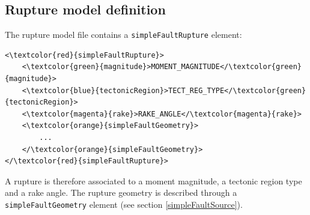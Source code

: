 \subsection{Rupture model definition}
The rupture model file contains a \Verb+simpleFaultRupture+ element:
\begin{Verbatim}[frame=single, commandchars=\\\{\},fontsize=\normalsize, samepage=true]
<\textcolor{red}{simpleFaultRupture}>
	<\textcolor{green}{magnitude}>MOMENT_MAGNITUDE</\textcolor{green}{magnitude}>
	<\textcolor{blue}{tectonicRegion}>TECT_REG_TYPE</\textcolor{green}{tectonicRegion}>
	<\textcolor{magenta}{rake}>RAKE_ANGLE</\textcolor{magenta}{rake}>
	<\textcolor{orange}{simpleFaultGeometry}>
		...
	</\textcolor{orange}{simpleFaultGeometry}>
</\textcolor{red}{simpleFaultRupture}>
\end{Verbatim}
A rupture is therefore associated to a moment magnitude, a tectonic region type and a rake angle. The rupture geometry is described through a \Verb+simpleFaultGeometry+ element (see section \ref{simpleFaultSource}).
